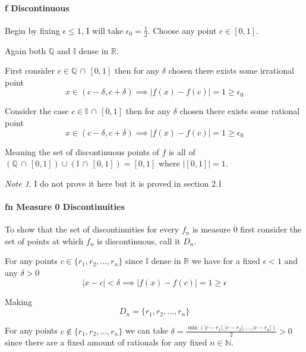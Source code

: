 \documentclass[12pt]{article}
\theoremstyle{plain}
\theoremstyle{definition}
\theoremstyle{definition}
\theoremstyle{remark}
\newtheorem*{remark}{Note}
\begin{document}
\paragraph{f Discontinuous}
Begin by fixing $\epsilon \leq 1$, I will take $\epsilon_0 = \frac{1}{2}$. Choose any point $c \in [0, 1]$.

Again both $\mathbb{Q}$ and $\mathbb{I}$ dense in $\mathbb{R}$.

First consider $c \in \mathbb{Q} \, \cap \, [0, 1]$ then for any $\delta$ chosen there exists some irrational point
\begin{equation}
    x \in (c - \delta, c + \delta) \implies |f(x) - f(c)| = 1 \geq \epsilon_0
\end{equation}

Consider the case $c \in \mathbb{I} \, \cap \, [0, 1]$ then for any $\delta$ chosen there exists some rational point
\begin{equation}
    x \in (c - \delta, c + \delta) \implies |f(x) - f(c)| = 1 \geq \epsilon_0
\end{equation}

Meaning the set of discontinuous points of $f$ is all of 
$(\mathbb{Q} \, \cap \, [0, 1]) \cup (\mathbb{I} \, \cap \, [0, 1]) = [0, 1]$ where $|[0, 1]| = 1$.
\begin{remark}
    I do not prove it here but it is proved in section 2.1
\end{remark}

\paragraph{fn Measure 0 Discontinuities}
To show that the set of discontinuities for every $f_n$ is measure 0 first consider the set of
points at which $f_n$ is discontinuous, call it $D_n$.

For any points $c \in \{r_1, r_2, \ldots, r_n\}$ since $\mathbb{I}$ dense in $\mathbb{R}$
we have for a fixed $\epsilon < 1$ and any $\delta > 0$
\begin{equation*}
    |x - c| < \delta \implies |f(x) - f(c)| = 1 \geq \epsilon
\end{equation*}

Making 
\begin{equation*}
    D_n = \{r_1, r_2, \ldots, r_n\}
\end{equation*}

For any points $c \not\in \{r_1, r_2, \ldots, r_n\}$ we can take $\delta = \frac{\min(|c - r_1|, |c - r_2|,
\ldots, |c - r_n|)}{2} > 0$ since there are a fixed amount of rationals for any fixed $n \in \mathbb{N}$.
\end{document}
